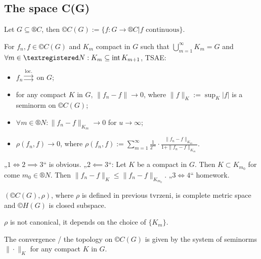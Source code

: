 \documentclass[12pt]{article}					%
\begin{document}
\subsection{The space C(G)}
\begin{definice}
	Let $G \subseteq ®C$, then $©C(G) := \{f: G \rightarrow ®C | f \text{ continuous}\}$.
\end{definice}

\begin{tvrzeni}
	For $f_n, f \in ©C(G)$ and $K_m$ compact in $G$ such that $\bigcup_{m=1}^∞ K_m = G$ and $\forall m \in ®N: K_m \subseteq \Int K_{m+1}$, TSAE:
	
	\begin{itemize}
		\item $f_n \overset{\text{loc.}}\rightrightarrows$ on $G$;
		\item for any compact $K$ in $G$, $\|f_n - f\| \rightarrow 0$, where $\|f\|_K := \sup_K |f|$ is a seminorm on $©C(G)$;
		\item $\forall m \in ®N: \|f_n - f\|_{K_m} \rightarrow 0$ for $u \rightarrow ∞$;
		\item $ρ(f_n, f) \rightarrow 0$, where $ρ(f_n, f) := \sum_{m=1}^∞ \frac{1}{2^m}·\frac{\|f_n - f\|_{K_m}}{1 + \|f_n - f\|_{K_m}}$.
	\end{itemize}

	\begin{dukazin}
		„$1 \Leftrightarrow 2 \implies 3$“ is obvious. „$2 \impliedby 3$“: Let $K$ be a compact in $G$. Then $K \subset K_{m_0}$ for come $m_0 \in ®N$. Then $\|f_n - f\|_K ≤ \|f_n - f\|_{K_{m_0}}$. „$3 \Leftrightarrow 4$“ homework.
	\end{dukazin}
\end{tvrzeni}

\begin{poznamka}
	$(©C(G), ρ)$, where $ρ$ is defined in previous tvrzeni, is complete metric space and $©H(G)$ is closed subspace.

	$ρ$ is not canonical, it depends on the choice of $\{K_m\}$.

	The convergence / the topology on $©C(G)$ is given by the system of seminorms $\|·\|_K$ for any compact $K$ in $G$.
\end{poznamka}
\end{document}
